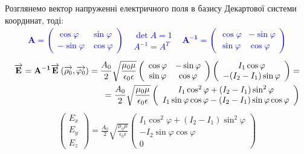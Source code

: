 Розглянемо вектор напруженні електричного поля в базису Декартової системи
координат, тоді: 
%
\textcolor{blue} { \begin{equation*} \begin{aligned}
\mathbf{A} = \left( \begin{array}{cc}
\cos \varphi & \sin \varphi \\
- \sin \varphi & \cos \varphi
\end{array} \right) \begin{array}{ccc}
	& \det A = 1 		&	\\
	& A^{-1} = A^{T}	&
\end{array} 
\mathbf{A^{-1}} = \left( \begin{array}{cc}
\cos \varphi & - \sin \varphi \\
\sin \varphi & \cos \varphi
\end{array} \right) 
\end{aligned} \end{equation*} }
%
\textcolor{blue} { \begin{equation*} \begin{aligned}
\overrightarrow{\mathbf E} = 
\mathbf{A^{-1}} \overrightarrow{\mathbf E} \left( \overrightarrow{\mathbf \rho_0}, \overrightarrow{\mathbf \varphi_0} \right) = 
\frac{A_0}{2} \sqrt{\frac{\mu_0 \mu}{\epsilon_0 \epsilon}}
\left( \begin{array}{cc} \cos \varphi & - \sin \varphi \\
\sin \varphi & \cos \varphi \end{array} \right)
\left( \begin{array}{c} I_1 \cos \varphi \\
- (I_2 - I_1) \sin \varphi \end{array} \right) = \\
= \frac{A_0}{2} \sqrt{\frac{\mu_0 \mu}{\epsilon_0 \epsilon}}
\left( \begin{array}{c} I_1 \cos^2 \varphi + (I_2 - I_1) \sin^2 \varphi \\
I_1 \sin \varphi \cos \varphi - (I_2 - I_1) 
\sin \varphi \cos \varphi \end{array} \right)
\end{aligned} \end{equation*} }
%
\begin{equation} \begin{aligned} \label{eq:Exyz}
\left( \begin{array}{c} E_x \\ E_y \\ E_z \end{array} \right) = 
\frac{A_0}{2}  \sqrt{\frac{\mu_0 \mu}{\epsilon_0 \epsilon}} 
\left( \begin{array}{c} 
I_1 \cos^2 \varphi + (I_2 - I_1) \sin^2 \varphi \\
- I_2 \sin \varphi \cos \varphi \\
0
\end{array} \right)
\end{aligned} \end{equation}


